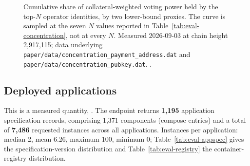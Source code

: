 \begin{figure}[H]
\centering
{}
\caption{Cumulative share of collateral-weighted voting power held by the top-$N$ operator
identities, by two lower-bound proxies. The curve is sampled at the seven $N$ values reported in
Table~\ref{tab:eval-concentration}, not at every $N$. Measured 2026-09-03 at chain height 2,917,115;
data underlying \texttt{paper/\allowbreak{}data/\allowbreak{}concentration\_payment\_address.\allowbreak{}dat} and
\texttt{paper/\allowbreak{}data/\allowbreak{}concentration\_pubkey.\allowbreak{}dat}. .}
\label{fig:eval-concentration}
\end{figure}

\subsection{Deployed applications}
\label{sec:eval-apps}

This is a measured quantity, \shipped {}.
The endpoint returns \textbf{1,195} application specification records, comprising 1,371 components
(compose entries) and a total of \textbf{7,486} requested instances across all applications.
Instances per application: median 2, mean 6.26, maximum 100, minimum 0;  Table~\ref{tab:eval-appspec} gives the specification-version
distribution and Table~\ref{tab:eval-registry} the container-registry distribution.

